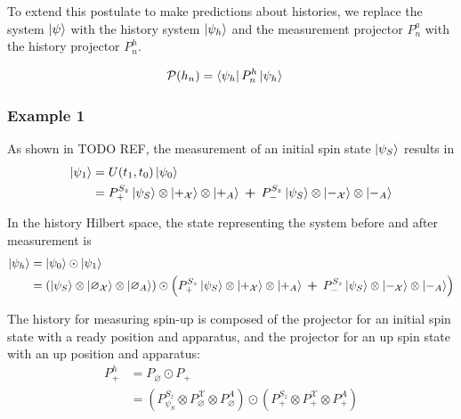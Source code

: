To extend this postulate to make predictions about histories, we replace the system $\ket{\psi}$ with the history system $\ket{\psi_h}$ and the measurement projector $P^a_n$ with the history projector $P^h_n$.

\begin{align}
    \mathcal{P}(h_n) &= \bra{\psi_h} P^h_n \ket{\psi_h}
\end{align}

\subsubsection{Example 1}

As shown in TODO REF, the measurement of an initial spin state $\ket{\psi_S}$ results in
\begin{align}
  \ket{{\psi}_1} &= U(t_1, t_0)\ket{{\psi}_0} \\ \nonumber
  &= P^{S_z}_+ \ket{\psi_S} \otimes \ket{+_\mathcal{X}} \otimes \ket{+_A}\: \bm{+} \: P^{S_z}_- \ket{\psi_S} \otimes \ket{-_\mathcal{X}} \otimes \ket{-_A}
\end{align}

In the history Hilbert space, the state representing the system before and after measurement is
\begin{align}
  \ket{\psi_h} &= \ket{\psi_0} \odot \ket{\psi_1} \\ \nonumber
  &= \left(\ket{\psi_S} \otimes \ket{\varnothing_\mathcal{X}} \otimes \ket{\varnothing_A} \right) \odot \left(P^{S_z}_+ \ket{\psi_S} \otimes \ket{+_\mathcal{X}} \otimes \ket{+_A} \: \bm{+} \: P^{S_z}_- \ket{\psi_S} \otimes \ket{-_\mathcal{X}} \otimes \ket{-_A} \right)
\end{align}

The history for measuring spin-up is composed of the projector for an initial spin state with a ready position and apparatus, and the projector for an up spin state with an up position and apparatus:
\begin{align}
  P^h_+ &= P_\varnothing \odot P_+ \\ \nonumber
  &= \left(P^{S_z}_{\psi_S} \otimes P^\mathcal{X}_\varnothing \otimes P^A_\varnothing \right) \odot \left(P^{S_z}_+ \otimes P^\mathcal{X}_+ \otimes P^A_+ \right)
\end{align}

